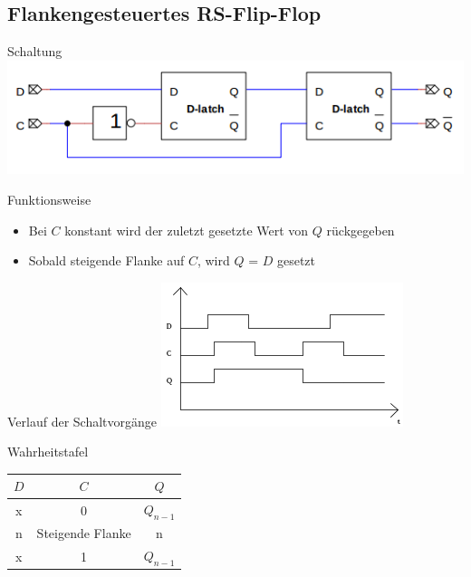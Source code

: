 \documentclass[compress,11pt]{beamer}
\begin{document}
\subsection{Flankengesteuertes RS-Flip-Flop}
\begin{frame}
\begin{block}{Schaltung}
\includegraphics[scale=0.7]{flanke}
\end{block}
\end{frame}
\begin{frame}
\begin{block}{Funktionsweise}
\begin{itemize}
\item Bei $C$ konstant wird der zuletzt gesetzte Wert von $Q$ rückgegeben
\item Sobald steigende Flanke auf $C$, wird $Q$ = $D$ gesetzt
\end{itemize}
\end{block}
\end{frame}
\begin{frame}
\begin{block}{Verlauf der Schaltvorgänge}
\includegraphics[scale=1]{triggerrs}
\end{block}
\end{frame}
\begin{frame}
\begin{block}{Wahrheitstafel}
\begin{tabular}{|c|c|c|}
\hline 
$D$ & $C$ & $Q$ \\ 
\hline 
x & 0 & $Q_{n-1}$ \\ 

n & Steigende Flanke & n \\ 
 
x & 1 & $Q_{n-1}$ \\ 
\hline 
\end{tabular} 
\end{block}
\end{frame}
\end{document}
